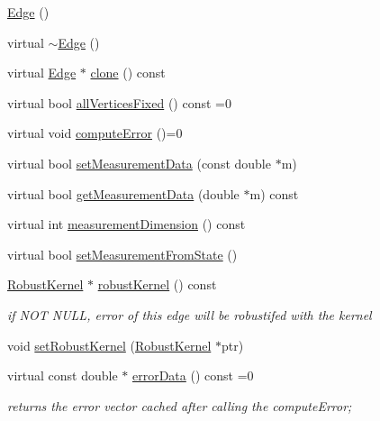 \begin{DoxyCompactItemize}
\item 
\hyperlink{classg2o_1_1OptimizableGraph_1_1Edge_a6568eb7f3b3e4299473ec3230199aa70}{Edge} ()
\item 
virtual \hyperlink{classg2o_1_1OptimizableGraph_1_1Edge_a62de61a43d47cf223fe39265dac13ca5}{$\sim$\+Edge} ()
\item 
virtual \hyperlink{classg2o_1_1OptimizableGraph_1_1Edge}{Edge} $\ast$ \hyperlink{classg2o_1_1OptimizableGraph_1_1Edge_a4f274bac9939144dd6b30578c5424a45}{clone} () const 
\item 
virtual bool \hyperlink{classg2o_1_1OptimizableGraph_1_1Edge_a414c69ca1617a4d3b620e39f2ffbcea7}{all\+Vertices\+Fixed} () const =0
\item 
virtual void \hyperlink{classg2o_1_1OptimizableGraph_1_1Edge_a1e6d9f4128866982de5e11e03edd7775}{compute\+Error} ()=0
\item 
virtual bool \hyperlink{classg2o_1_1OptimizableGraph_1_1Edge_ae8d99a85921057eba87a2346ba9c6e0a}{set\+Measurement\+Data} (const double $\ast$m)
\item 
virtual bool \hyperlink{classg2o_1_1OptimizableGraph_1_1Edge_a5f7c64421d33b7deb8fcfd5f4cf172b8}{get\+Measurement\+Data} (double $\ast$m) const 
\item 
virtual int \hyperlink{classg2o_1_1OptimizableGraph_1_1Edge_a44bd732330859991d4fbc992129b2e79}{measurement\+Dimension} () const 
\item 
virtual bool \hyperlink{classg2o_1_1OptimizableGraph_1_1Edge_a2f0b6465d6cd8b459ebc6494892c44f4}{set\+Measurement\+From\+State} ()
\item 
\hyperlink{classg2o_1_1RobustKernel}{Robust\+Kernel} $\ast$ \hyperlink{classg2o_1_1OptimizableGraph_1_1Edge_aeb6ce9f3bf7b896f58272ea0d3feb8ff}{robust\+Kernel} () const 
\begin{DoxyCompactList}\small\item\em if N\+OT N\+U\+LL, error of this edge will be robustifed with the kernel \end{DoxyCompactList}\item 
void \hyperlink{classg2o_1_1OptimizableGraph_1_1Edge_a42955172c19f16e2cfbb30d611d1bd87}{set\+Robust\+Kernel} (\hyperlink{classg2o_1_1RobustKernel}{Robust\+Kernel} $\ast$ptr)
\item 
virtual const double $\ast$ \hyperlink{classg2o_1_1OptimizableGraph_1_1Edge_a5f2a4b6efa2d0ae600f94a28a6ba58cf}{error\+Data} () const =0
\begin{DoxyCompactList}\small\item\em returns the error vector cached after calling the compute\+Error; \end{DoxyCompactList}\item 

\end{DoxyCompactItemize}
